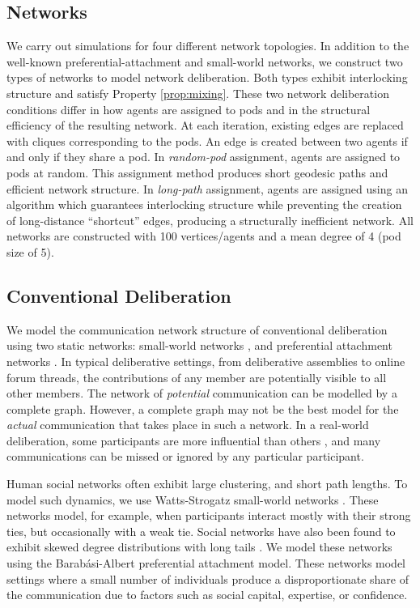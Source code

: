 \subsection{Networks}

We carry out simulations for four different network topologies. In addition to the well-known preferential-attachment \cite{barabasi_emergence_1999} and small-world \cite{watts_collective_1998} networks, we construct two types of networks to model network deliberation.
Both types exhibit interlocking structure and satisfy Property \ref{prop:mixing}.
These two network deliberation conditions differ in how agents are assigned to pods and in the structural efficiency of the resulting network.
At each iteration, existing edges are replaced with cliques corresponding to the pods. An edge is created between two agents if and only if they share a pod.
In {\em random-pod} assignment, agents are assigned to pods at random.
This assignment method produces short geodesic paths and efficient network structure.
In {\em long-path} assignment, agents are assigned using an algorithm which guarantees interlocking structure while preventing the creation of long-distance ``shortcut'' edges, producing a structurally inefficient network.
All networks are constructed with 100 vertices/agents and a mean degree of 4 (pod size of 5).

\subsection{Conventional Deliberation}
We model the communication network structure of conventional deliberation using two static networks: small-world networks \cite{watts_collective_1998}, and preferential attachment networks \cite{barabasi_emergence_1999}. In typical deliberative settings, from deliberative assemblies to online forum threads, the contributions of any member are potentially visible to all other members.
The network of {\em potential} communication can be modelled by a complete graph.
However, a complete graph may not be the best model for the {\em actual} communication that takes place in such a network. In a real-world deliberation, some participants are more influential than others \cite{goel_structure_2012, shaw_laboratories_2014}, and many communications can be missed or ignored by any particular participant.

Human social networks often exhibit large clustering, and short path lengths.
To model such dynamics, we use Watts-Strogatz small-world networks  \cite{watts_collective_1998}.
These networks model, for example, when participants interact mostly with their strong ties, but occasionally with a weak tie. Social networks have also been found to exhibit skewed degree distributions with long tails \cite{barabasi_emergence_1999}.
We model these networks using the Barabási-Albert preferential attachment model.
These networks model settings where a small number of individuals produce a disproportionate share of the communication due to factors such as social capital, expertise, or confidence.

